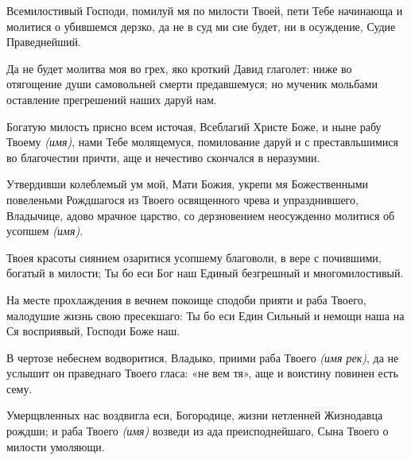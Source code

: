 \begin{mymulticols}


Всемилостивый Господи, помилуй мя по милости Твоей, пети Тебе начинающа и молитися о убившемся дерзко, да не в суд ми сие будет, ни в осуждение, Судие Праведнейший.




Да не будет молитва моя во грех, яко кроткий Давид глаголет: ниже во отягощение души самовольней смерти предавшемуся; но мученик мольбами оставление прегрешений наших даруй нам.


\slava


Богатую милость присно всем источая, Всеблагий Христе Боже, и ныне рабу Твоему {\itshape (имя)}, нами Тебе молящемуся, помилование даруй и с преставльшимися во благочестии причти, аще и нечестиво скончался в неразумии.


\inyne


Утвердивши колеблемый ум мой, Мати Божия, укрепи мя Божественными повеленьми Рождшагося из Твоего освященного чрева и упразднившего, Владычице, адово мрачное царство, со дерзновением неосужденно молитися об усопшем {\itshape (имя)}. 







Твоея красоты сиянием озаритися усопшему благоволи, в вере с почившими, богатый в милости; Ты бо еси Бог наш Единый безгрешный и многомилостивый.




На месте прохлаждения в вечнем покоище сподоби прияти и раба Твоего, малодушие жизнь свою пресекшаго: Ты бо еси Един Сильный и немощи наша на Ся восприявый, Господи Боже наш.


\slava


В чертозе небеснем водворитися, Владыко, приими раба Твоего {\itshape (имя рек)}, да не услышит он праведнаго Твоего гласа: «не вем тя», аще и воистину повинен есть сему.


\inyne


Умерщвленных нас воздвигла еси, Богородице, жизни нетленней Жизнодавца рождши; и раба Твоего {\itshape (имя)} возведи из ада преисподнейшаго, Сына Твоего о милости умоляющи. 



\end{mymulticols}
